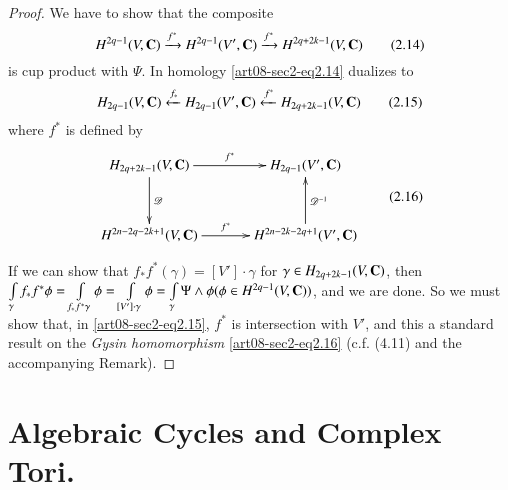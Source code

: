 \begin{proof}
We have to show that the composite
\begin{equation*}
H^{2q-1}(V,\mathbf{C})\xrightarrow{f^{*}}H^{2q-1}(V',\mathbf{C})\xrightarrow{f^{*}}H^{2q+2k-1}(V,\mathbf{C})\tag{2.14}\label{art08-sec2-eq2.14}
\end{equation*}
is cup product with $\Psi$. In homology \eqref{art08-sec2-eq2.14} dualizes to 
\begin{equation*}
H_{2q-1}(V,\mathbf{C})\xleftarrow{f_{*}}H_{2q-1}(V',\mathbf{C})\xleftarrow{f^{*}}H_{2q+2k-1}(V,\mathbf{C})\tag{2.15}\label{art08-sec2-eq2.15}
\end{equation*}
where $f^{*}$ is defined by
\begin{equation*}
\vcenter{\xymatrix@=1.2cm{
H_{2q+2k-1}(V,\bfC)\ar[d]^-{\mathscr{D}}\ar[r]^-{f^{*}} & H_{2q-1}(V',\bfC)\\
H^{2n-2q-2k+1}(V,\bfC)\ar[r]^-{f^{*}} & H^{2n-2k-2q+1}(V',\bfC)\ar[u]_{\mathscr{D}^{-1}}
}}\tag{2.16}\label{art08-sec2-eq2.16}
\end{equation*}

If we can show that $f_{*}f^{*}(\gamma)=[V']\cdot \gamma$ for $\gamma \in H_{2q+2k-1}(V,\mathbf{C})$, then $\int\limits_{\gamma}f_{*}f^{*}\phi=\int\limits_{f_{*}f^{*}\gamma}\phi=\int\limits_{[V']\cdot \gamma}\phi=\int\limits_{\gamma}\Psi \wedge \phi(\phi\in H^{2q-1}(V,\mathbf{C}))$, and we are done. So we must show that, in \eqref{art08-sec2-eq2.15}, $f^{*}$ is intersection with $V'$, and this a standard result on the {\em Gysin homomorphism} \eqref{art08-sec2-eq2.16} (c.f. (4.11) and the accompanying Remark).
\end{proof}

\section{Algebraic Cycles and Complex Tori.}\label{art08-sec3}

